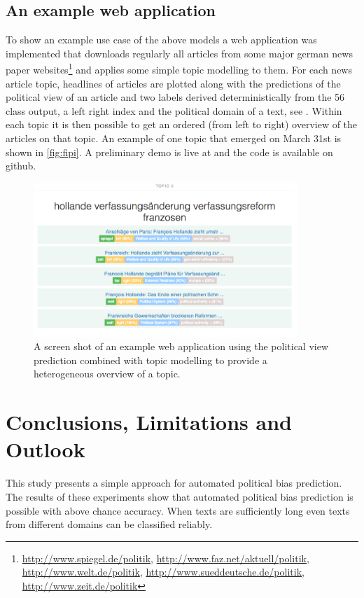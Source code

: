 \documentclass[runningheads,a4paper]{llncs}
\begin{document}
\subsection{An example web application}
To show an example use case of the above models a web application was implemented that downloads regularly all articles from some major german news paper websites\footnote{\url{http://www.spiegel.de/politik}, \url{http://www.faz.net/aktuell/politik}, \url{http://www.welt.de/politik}, \url{http://www.sueddeutsche.de/politik}, \url{http://www.zeit.de/politik}} and applies some simple topic modelling to them. For each news article topic, headlines of articles are plotted along with the predictions of the political view of an article and two labels derived deterministically from the 56 class output, a left right index and the political domain of a text, see \cite{leftright}. Within each topic it is then possible to get an ordered (from left to right) overview of the articles on that topic. An example of one topic that emerged on March 31st is shown in \autoref{fig:fipi}. A preliminary demo is live at \cite{fipidemo} and the code is available on github\cite{fipi}.
\begin{figure}
\begin{center}
\includegraphics[width=10cm]{images/fipi-screenshot}
%
\end{center}
\caption{
\label{fig:fipi}
A screen shot of an example web application using the political view prediction combined with topic modelling to provide a heterogeneous overview of a topic. }
\end{figure}


\section{Conclusions, Limitations and Outlook}\label{sec:conclusion}
This study presents a simple approach for automated political bias prediction. The results of these experiments show that automated political bias prediction is possible with above chance accuracy. When texts are sufficiently long even texts from different domains can be classified reliably. \\
\end{document}

